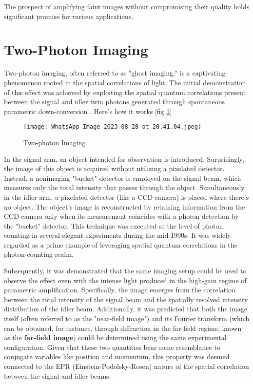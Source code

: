 \documentclass{article}
\begin{document}
The prospect of amplifying faint images without compromising their quality holds significant promise for various applications.

\section{Two-Photon Imaging}
Two-photon imaging, often referred to as "ghost imaging," is a captivating phenomenon rooted in the spatial correlations of light. The initial demonstration of this effect was achieved by exploiting the spatial quantum correlations present between the signal and idler twin photons generated through spontaneous parametric down-conversion \cite{PhysRevLett.74.3600}. Here's how it works [fig \ref{fig:4}]
\begin{figure}[h]
    \centering
    \texttt{[image: WhatsApp Image 2023-08-28 at 20.41.04.jpeg]}
    \caption{Two-photon Imaging}
    \label{fig:4}
\end{figure}

In the signal arm, an object intended for observation is introduced. Surprisingly, the image of this object is acquired without utilizing a pixelated detector. Instead, a nonimaging "bucket" detector is employed on the signal beam, which measures only the total intensity that passes through the object. Simultaneously, in the idler arm, a pixelated detector (like a CCD camera) is placed where there's no object. The object's image is reconstructed by retaining information from the CCD camera only when its measurement coincides with a photon detection by the "bucket" detector. This technique was executed at the level of photon counting in several elegant experiments during the mid-1990s. It was widely regarded as a prime example of leveraging spatial quantum correlations in the photon-counting realm.

Subsequently, it was demonstrated that the same imaging setup could be used to observe the effect even with the intense light produced in the high-gain regime of parametric amplification. Specifically, the image emerges from the correlation between the total intensity of the signal beam and the spatially resolved intensity distribution of the idler beam. Additionally, it was predicted that both the image itself (often referred to as the "near-field image") and its Fourier transform (which can be obtained, for instance, through diffraction in the far-field regime, known as the \textbf{far-field image}) could be determined using the same experimental configuration. Given that these two quantities bear some resemblance to conjugate variables like position and momentum, this property was deemed connected to the EPR (Einstein-Podolsky-Rosen) nature of the spatial correlation between the signal and idler beams.
\end{document}
